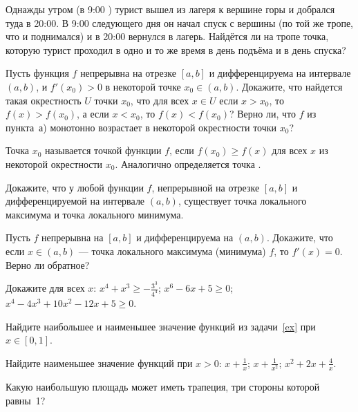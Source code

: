\documentclass[a4paper,12pt]{article}
\begin{document}


  Однажды утром (в 9:00 ) турист вышел из лагеря к вершине горы и добрался туда в 20:00. В 9:00
следующего дня он начал спуск с вершины (по той же тропе, что и поднимался) и в 20:00 вернулся в лагерь.
Найдётся ли на тропе точка, которую турист проходил в одно и то же время в день подъёма и в день спуска?




 Пусть функция $f$
непрерывна на отрезке $[a,b]$  и дифференцируема на интервале $(a,b)$,
и $f'(x_0)>0$ в некоторой точке \hbox{$x_0\in (a,b)$.}
Докажите, что найдется такая окрестность $U$ точки $x_0$, что
для всех \hbox{$x\in U$} если $x>x_0$, то
$f(x)>f(x_0)$, а если $x<x_0$, то $f(x)<f(x_0)$?
 Верно ли, что $f$ из пункта~а) монотонно
возрастает в некоторой окрестности точки $x_0$?


 Точка $x_0$ называется точкой  функции $f$,
если $f(x_0)\ge f(x)$ для всех $x$ из некоторой окрестности $x_0$.
Аналогично определяется точка .

 Докажите, что у любой функции $f$,
непрерывной на отрезке $[a,b]$  и дифференцируемой на интервале $(a,b)$,
существует точка локального максимума и точка локального минимума.

  Пусть $f$
непрерывна на $[a,b]$  и дифференцируема на $(a,b)$.
Докажите, что если $x\in (a,b)$ --- точка локального
максимума (минимума) $f$, то $f'(x)=0$. Верно ли обратное?

 Докажите для всех $x$:
\label{ex}
 $x^4+x^3\ge -\frac{3^3}{4^4}$;
 $x^6-6x+5\ge 0$;
 $x^4-4x^3+10x^2-12x+5\ge 0$.



 Найдите наибольшее и наименьшее значение функций из задачи~\ref{ex} при $x\in [0,1]$.



 Найдите наименьшее значение функций при $x>0$:
 $x+\frac{1}{x}$;
 $x+\frac{1}{x^2}$;
 $x^2+2x+\frac{4}{x}$.

Какую наибольшую площадь может иметь трапеция,
три стороны которой равны~1?
\end{document}
